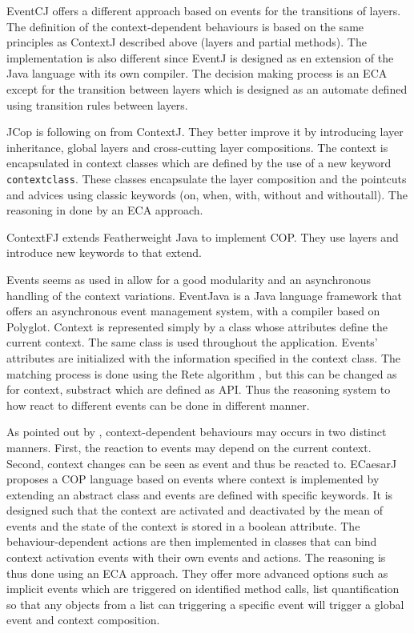 \documentclass[a4paper]{article}
\begin{document}
EventCJ \cite{kamina_eventcj:_2011} offers a different approach based on events for the transitions of layers. The definition of the context-dependent behaviours is based on the same principles as ContextJ described above (layers and partial methods). The implementation is also different since EventJ is designed as en extension of the Java language with its own compiler. The decision making process is an ECA except for the transition between layers which is designed as an automate defined using transition rules between layers.


JCop \cite{appeltauer_declarative_2013} is following on from ContextJ. They better improve it by introducing layer inheritance, global layers and cross-cutting layer compositions. The context is encapsulated in context classes which are defined by the use of a new keyword \lstinline|contextclass|. These classes encapsulate the layer composition and the pointcuts and advices using classic keywords (on, when, with, without and withoutall). The reasoning in done by an ECA approach.

ContextFJ \cite{clarke_semantics_2009} extends Featherweight Java \cite{} to implement COP. They use layers and introduce new keywords to that extend.

Events seems as used in \cite{kamina_eventcj:_2011} allow for a good modularity and an asynchronous handling of the context variations. EventJava \cite{jayaram_context-oriented_2009} is a Java language framework that offers an asynchronous event management system, with a compiler based on Polyglot. Context is represented simply by a class whose attributes define the current context. The same class is used throughout the application. Events' attributes are initialized with the information specified in the context class. The matching process is done using the Rete algorithm \cite{}, but this can be changed as for context, substract which are defined as API. Thus the reasoning system to how react to different events can be done in different manner.

As pointed out by \cite{nunez_declarative_2009}, context-dependent behaviours may occurs in two distinct manners. First, the reaction to events may depend on the current context. Second, context changes can be seen as event and thus be reacted to. ECaesarJ \cite{nunez_declarative_2009} proposes a COP language based on events where context is implemented by extending an abstract class and events are defined with specific keywords. It is designed such that the context are activated and deactivated by the mean of events and the state of the context is stored in a boolean attribute. The behaviour-dependent actions are then implemented in classes that can bind context activation events with their own events and actions. The reasoning is thus done using an ECA approach. They offer more advanced options such as implicit events which are triggered on identified method calls, list quantification so that any objects from a list can triggering a specific event will trigger a global event and context composition.
\end{document}
